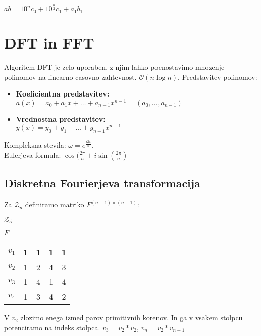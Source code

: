 \documentclass{article}
\begin{document}
\begin{multicols}{4}
\begin{center}
    \begin{math}
        ab = 10^n c_0 + 10^{\frac{n}{2}} c_1 + a_1 b_1
    \end{math}
\end{center}
\section{DFT in FFT}
Algoritem DFT je zelo uporaben, z njim lahko poenostavimo mnozenje polinomov na linearno casovno zahtevnost. $\mathcal{O}(n \log n)$.
Predstavitev polinomov:

\begin{itemize}
    \item \textbf{Koeficientna predstavitev:}\\ $a(x) = a_0 +  a_1 x + \dots + a_{n-1} x^{n-1} = (a_0, \dots, a_{n-1})$
    \item \textbf{Vrednostna predstavitev:}\\ $y(x) = y_0 +  y_1 + \dots + y_{n-1} x^{n-1}$
\end{itemize}
Kompleksna stevila:
$\omega = e^{\frac{i 2 \pi}{n}}$,\\
Eulerjeva formula:
$\cos(\frac{2\pi}{n} + i \sin(\frac{2\pi}{n})$


\subsection{Diskretna Fourierjeva transformacija}
Za $\mathcal{Z}_n$ definiramo matriko $F^{(n-1) \times (n-1)}$:

$\mathcal{Z}_5$
\begin{center}
    $F =$
    \begin{tabular}{ |c|c|c|c|c| } 
        \hline
        $v_1$ &     1 & 1 & 1 & 1 \\ 
        \hline
        $v_2$ &     1 & 2 & 4 & 3 \\  
        \hline
        $v_3$ &     1 & 4 & 1 & 4 \\
        \hline
        $v_4$ &     1 & 3 & 4 & 2 \\
        \hline
    \end{tabular}
\end{center}
V $v_2$ zlozimo enega izmed parov primitivnih korenov. In ga v vsakem stolpcu potenciramo na indeks stolpca.
$v_3 = v_2 * v_2$, $v_n = v_2 * v_{n-1}$


\end{multicols}
\end{document}
